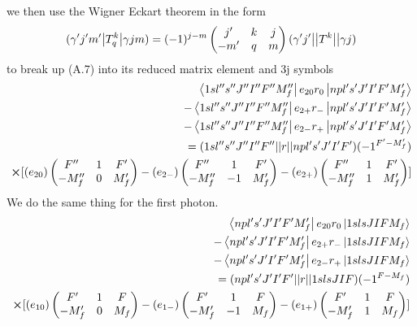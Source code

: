 we then use the Wigner Eckart theorem in the form \cite{edmonds}
\begin{equation}
    (\gamma'j'm'\abs{T^k_q}\gamma jm)=(-1)^{j-m}
    \begin{pmatrix}
    j'  &k &j \\
    -m' &q &m
    \end{pmatrix}
    (\gamma'j'\abs{\abs{T^k}}\gamma j)
\end{equation}
to break up (A.7) into its reduced matrix element and 3j symbols
\begin{align}
\begin{split}
    \bra{1s l'' s'' J'' I'' F'' M_f''}
    e_{20}r_0
    \ket{np l's'J'I'F'M_f'}\\
    -\bra{1s l'' s'' J'' I'' F'' M_f''}
    e_{2+}r_-
    \ket{np l's'J'I'F'M_f'}\\
    -\bra{1s l'' s'' J'' I'' F'' M_f''}
    e_{2-}r_+
    \ket{np l's'J'I'F'M_f'}\\
    =(1sl'' s'' J'' I'' F''\abs{\abs{r}}np l's'J'I'F')(-1^{F'-M_f'})\\
    \cross[
    (e_{20})
    \begin{pmatrix}
    F''    & 1 & F'\\
    -M_f'' & 0 &M_f'
    \end{pmatrix}
    -
    (e_{2-})
    \begin{pmatrix}
    F''    & 1  & F'\\
    -M_f'' & -1 &M_f'
    \end{pmatrix}
    -
    (e_{2+})
    \begin{pmatrix}
    F''    & 1 & F'\\
    -M_f'' & 1 &M_f'
    \end{pmatrix}
    ]
\end{split}
\end{align}
We do the same thing for the first photon.
\begin{align}
\begin{split}
    \bra{np l' s' J' I' F' M_f'}
    e_{20}r_0
    \ket{1s lsJIFM_f}\\
    -\bra{np l' s' J' I' F' M_f'}
    e_{2+}r_-
    \ket{1s lsJIFM_f}\\
    -\bra{np l' s' J' I' F' M_f'}
    e_{2-}r_+
    \ket{1s lsJIFM_f}\\
    =(npl' s' J' I' F'\abs{\abs{r}}1s lsJIF)(-1^{F-M_f})\\
    \cross[
    (e_{10})
    \begin{pmatrix}
    F'    & 1 & F\\
    -M_f' & 0 &M_f
    \end{pmatrix}
    -
    (e_{1-})
    \begin{pmatrix}
    F'    & 1  & F\\
    -M_f' & -1 &M_f
    \end{pmatrix}
    -
    (e_{1+})
    \begin{pmatrix}
    F'    & 1 & F\\
    -M_f' & 1 &M_f
    \end{pmatrix}
    ]
\end{split}
\end{align}
